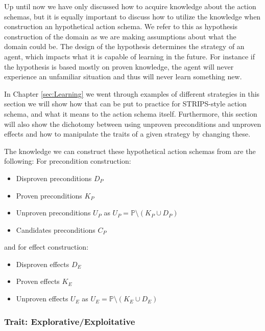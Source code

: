\documentclass[../Master.tex]{subfiles}
\begin{document}
	Up until now we have only discussed how to acquire knowledge about the action schemas, but it is equally important to discuss how to utilize the knowledge when construction an hypothetical action schema.
	We refer to this as hypothesis construction of the domain as we are making assumptions about what the domain could be.
	The design of the hypothesis determines the strategy of an agent, which impacts what it is capable of learning in the future.
	For instance if the hypothesis is based mostly on proven knowledge, the agent will never experience an unfamiliar situation and thus will never learn something new.

	In Chapter \ref{sec:Learning} we went through examples of different strategies in this section we will show how that can be put to practice for STRIPS-style action schema, and what it means to the action schema itself.
	Furthermore, this section will also show the dichotomy between using unproven preconditions and unproven effects and how to manipulate the traits of a given strategy by changing these.

	The knowledge we can construct these hypothetical action schemas from are the following: 
	For precondition construction:

	\begin{itemize}
		\item Disproven preconditions $D_P$
		\item Proven preconditions $K_P$
		\item Unproven preconditions $U_P$ as $U_P = \mathbb{P} \setminus (K_P \cup D_P)$
		\item Candidates preconditions $C_P$
	\end{itemize}

	and for effect construction:

	\begin{itemize}
		\item Disproven effects $D_E$
		\item Proven effects $K_E$
		\item Unproven effects $U_E$ as $U_E = \mathbb{P} \setminus (K_E \cup D_E)$
	\end{itemize}

\subsubsection{Trait: Explorative/Exploitative}
\end{document}
